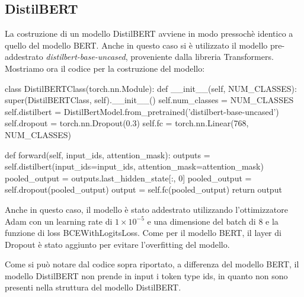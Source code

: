 \documentclass[../../Thesis.tex]{subfiles}
\begin{document}
\subsection{DistilBERT}
La costruzione di un modello DistilBERT avviene in modo pressoch\`e identico a quello del modello BERT. Anche in questo caso si \`e utilizzato il modello pre-addestrato \textit{distilbert-base-uncased}, proveniente dalla libreria Transformers. Mostriamo ora il codice per la costruzione del modello:
\begin{python}
    class DistilBERTClass(torch.nn.Module):
    def __init__(self, NUM_CLASSES):
        super(DistilBERTClass, self).__init__()
        self.num_classes = NUM_CLASSES
        self.distilbert = DistilBertModel.from_pretrained('distilbert-base-uncased')
        self.dropout = torch.nn.Dropout(0.3)
        self.fc = torch.nn.Linear(768, NUM_CLASSES)
    
    def forward(self, input_ids, attention_mask):
        outputs = self.distilbert(input_ids=input_ids, attention_mask=attention_mask)
        pooled_output = outputs.last_hidden_state[:, 0]
        pooled_output = self.dropout(pooled_output)
        output = self.fc(pooled_output)
        return output
\end{python}
Anche in questo caso, il modello \`e stato addestrato utilizzando l'ottimizzatore Adam con un learning rate di $1 \times 10^{-5}$ e una dimensione del batch di 8 e la funzione di loss BCEWithLogitsLoss. Come per il modello BERT, il layer di Dropout \`e stato aggiunto per evitare l'overfitting del modello.

Come si pu\`o notare dal codice sopra riportato, a differenza del modello BERT, il modello DistilBERT non prende in input i token type ids, in quanto non sono presenti nella struttura del modello DistilBERT.
\end{document}

